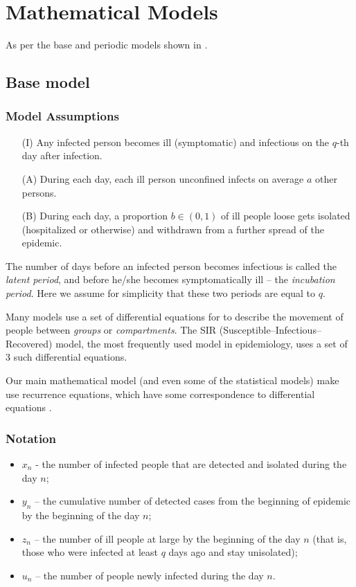 \section{Mathematical Models}
\label{ch:mathmodel}

As per the base and periodic models shown in \cite{grigor20}.

\subsection{Base model}

\subsubsection{Model Assumptions}
\begin{itemize}
    \item[(I)] Any infected person becomes ill (symptomatic) and infectious on the $q$-th day after infection.
    \item[(A)] During each day, each ill person unconfined infects on average $a$ other persons.
    \item[(B)] During each day, a proportion $b\in (0,1)$ of ill people loose gets isolated (hospitalized or otherwise) and withdrawn from a further spread of the epidemic.
\end{itemize}

\begin{nremark}
The number of days before an infected person becomes infectious is called the \textit{latent period}, and before he/she becomes symptomatically ill – the \textit{incubation period}. Here we assume for simplicity that these two periods are equal to $q$.
\end{nremark}

Many models use a set of differential equations for to describe the movement of people between \textit{groups} or \textit{compartments}. The SIR (Susceptible–Infectious–Recovered) model, the most frequently used model in epidemiology, uses a set of 3 such differential equations. 

Our main mathematical model (and even some of the statistical models) make use recurrence equations, which have some correspondence to differential equations \cite{AGARWAL20021}.

\subsubsection{Notation}
\begin{itemize}
    \item $x_n$ - the number of infected people that are detected and isolated during the day $n$;
    \item $y_n$ – the cumulative number of detected cases from the beginning of epidemic by the beginning of the day $n$;
    \item $z_n$ – the number of ill people at large by the beginning of the day $n$ (that is, those who were infected at least $q$ days ago and stay unisolated);
    \item $u_n$ – the number of people newly infected during the day $n$.
\end{itemize}

